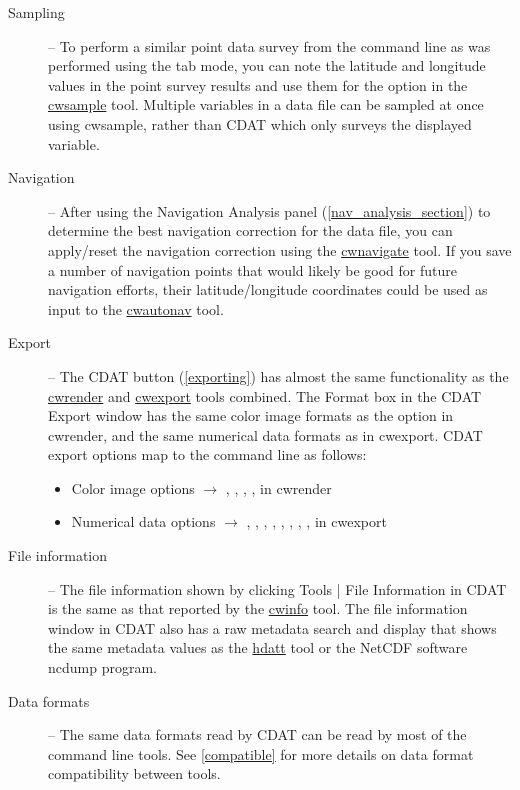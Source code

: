 \begin{description}
\item[Sampling] -- To perform a similar point data survey from
the command line as was performed using the
 tab 
mode, you can note the latitude and longitude values in the point
survey results and use them for the  option in
the \hyperlink{cwsample}{cwsample} tool.  Multiple variables in a
data file can be sampled at once using cwsample, rather than CDAT
which only surveys the displayed variable.

\item[Navigation] -- After using the {\gui Navigation Analysis} panel
(\autoref{nav_analysis_section}) to determine the best navigation
correction for the data file, you can apply/reset the navigation
correction using the \hyperlink{cwnavigate}{cwnavigate} tool.
If you save a number of navigation points that would likely be
good for future navigation efforts, their latitude/longitude
coordinates could be used as input to the
\hyperlink{cwautonav}{cwautonav} tool.

\item[Export] -- The CDAT  button
(\autoref{exporting}) has almost the same functionality as the
\hyperlink{cwrender}{cwrender} and \hyperlink{cwexport}{cwexport}
tools combined.  The {\gui Format} box in the CDAT {\gui Export}
window has the same color image formats as the
 option in cwrender, and the same numerical
data formats as  in cwexport.  CDAT export
options map to the command line as follows:
\begin{itemize}

\item Color image options $\rightarrow$ ,
, ,
,  in cwrender

\item Numerical data options $\rightarrow$ ,
, , ,
, , ,
,  in cwexport

\end{itemize}

\item[File information] -- The file information shown by clicking
{\gui Tools | File Information} in CDAT is the same as that
reported by the \hyperlink{cwinfo}{cwinfo} tool.  The file information window
in CDAT also has a raw metadata search and display that shows
the same metadata values as the \hyperlink{hdatt}{hdatt} tool or the NetCDF 
software ncdump program.

\item[Data formats] -- The same data formats read by CDAT can be read by 
most of the command line tools.  See \autoref{compatible} for more details on
data format compatibility between tools.

\end{description}
